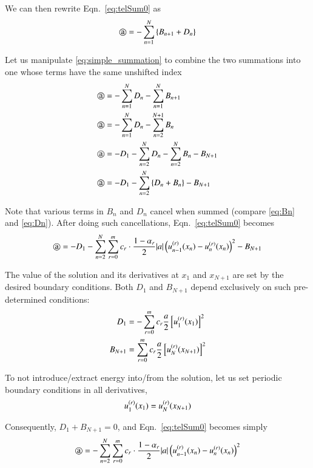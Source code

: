 We can then rewrite Eqn.~\eqref{eq:telSum0} as
\begin{equation}\label{eq:simple_summation}
  \text{\textcircled{a}} = -\sum_{n=1}^{N} \left\{ B_{n+1} + D_{n} \right\} 
\end{equation}

Let us manipulate \eqref{eq:simple_summation} to combine the two summations into one whose terms have the same unshifted index
\begin{equation}
\begin{split}
  \text{\textcircled{a}} &=  - \sum_{n=1}^{N} D_{n} -\sum_{n=1}^{N}  B_{n+1} \\
  \text{\textcircled{a}} &= - \sum_{n=1}^{N} D_{n} -\sum_{n=2}^{N+1}  B_{n}  \\
  \text{\textcircled{a}} &= - D_{1} - \sum_{n=2}^{N} D_{n}  - \sum_{n=2}^{N}  B_{n}  - B_{N+1} \\
  \text{\textcircled{a}} &= - D_{1} - \sum_{n=2}^{N} \left\{ D_{n}  +  B_{n} \right\}  - B_{N+1}
\end{split}
\end{equation}

Note that various terms in $B_n$ and $D_n$ cancel when summed (compare \eqref{eq:Bn} and \eqref{eq:Dn}). After doing such cancellations,
Eqn.~\eqref{eq:telSum0} becomes
\begin{equation}
 \text{\textcircled{a}} = -D_1 - \sum_{n=2}^{N} \sum^m_{r=0} c_r
\cdot \frac{1-\alpha_r}{2} |a| \left({{u}^{(r)}_{n-1}(x_{n})} - {{u}^{(r)}_{n}(x_{n})} \right)^2 - B_{N+1} 
\end{equation}

The value of the solution and its derivatives at $x_1$ and $x_{N+1}$ are set by the desired boundary conditions. Both $D_1$ and $B_{N+1}$ depend exclusively on such pre-determined conditions:
\begin{align}
 D_1 &= -\sum^m_{r=0} c_r\frac{a}{2} \left[ {{u}^{(r)}_{1}(x_{1})}\right]^2 \\
 B_{N+1} &= \sum^m_{r=0} c_r\frac{a}{2} \left[ {{u}^{(r)}_{N}(x_{N+1})}\right]^2
\end{align}

To not introduce/extract energy into/from the solution, let us set periodic boundary conditions in all derivatives,
\begin{equation}
 {{u}^{(r)}_{1}(x_{1})} = {{u}^{(r)}_{N}(x_{N+1})}
\end{equation}

Consequently, $D_1 + B_{N+1} = 0$, and Eqn.~\eqref{eq:telSum0} becomes simply
\begin{equation}
 \text{\textcircled{a}} = - \sum_{n=2}^{N} \sum^m_{r=0} c_r
\cdot \frac{1-\alpha_r}{2} |a| \left({{u}^{(r)}_{n-1}(x_{n})} - {{u}^{(r)}_{n}(x_{n})} \right)^2
\end{equation}

